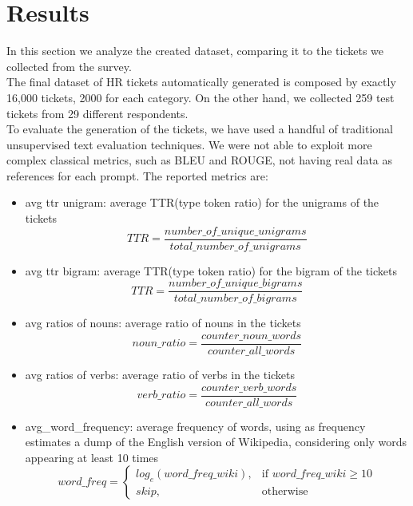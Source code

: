 \section{Results}
\label{sec:results}

In this section we analyze the created dataset, comparing it to the tickets we collected from the survey. \\
The final dataset of HR tickets automatically generated is composed by exactly 16,000 tickets, 2000 for each category. On the other hand, we collected 259 test tickets from 29 different respondents. \\
To evaluate the generation of the tickets, we have used a handful of traditional unsupervised text evaluation techniques. We were not able to exploit more complex classical metrics, such as BLEU and ROUGE, not having real data as references for each prompt.
The reported metrics are:
\begin{itemize}
    \item avg ttr unigram: average TTR(type token ratio) for the unigrams of the tickets\\ 
    \begin{equation*}
        TTR = \frac{number\_of\_unique\_unigrams}{total\_number\_of\_unigrams}
    \end{equation*}
    \item avg ttr bigram: average TTR(type token ratio) for the bigram of the tickets\\ 
    \begin{equation*}
        TTR = \frac{number\_of\_unique\_bigrams}{total\_number\_of\_bigrams}
    \end{equation*}
    \item avg ratios of nouns: average ratio of nouns in the tickets\\
    \begin{equation*}
        noun\_ratio = \frac{counter\_noun\_words}{counter\_all\_words}
    \end{equation*}
    \item avg ratios of verbs: average ratio of verbs in the tickets\\
    \begin{equation*}
        verb\_ratio = \frac{counter\_verb\_words}{counter\_all\_words}
    \end{equation*}
    \item avg\_word\_frequency: average frequency of words, using as frequency estimates a dump of the English version of Wikipedia, considering only words appearing at least 10 times\\
    \begin{equation*}
        word\_freq= 
        \begin{cases}
            log_{e}(word\_freq\_wiki),& \text{if } word\_freq\_wiki\geq 10\\
            skip,                   & \text{otherwise}
        \end{cases}
    \end{equation*}
\end{itemize}
